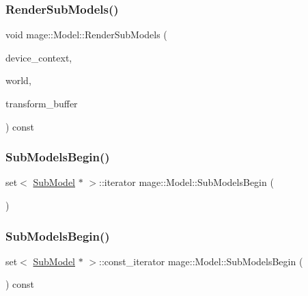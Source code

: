 \hypertarget{classmage_1_1_model_aa7f89b4f08adde59e27f3eb06428c17f}{}\label{classmage_1_1_model_aa7f89b4f08adde59e27f3eb06428c17f} 
\subsubsection{\texorpdfstring{Render\+Sub\+Models()}{RenderSubModels()}}
{\footnotesize\ttfamily void mage\+::\+Model\+::\+Render\+Sub\+Models (\begin{DoxyParamCaption}\item[{\hyperlink{namespacemage_ae74f374780900893caa5555d1031fd79}{Com\+Ptr}$<$ I\+D3\+D11\+Device\+Context2 $>$}]{device\+\_\+context,  }\item[{const \hyperlink{classmage_1_1_world}{World} \&}]{world,  }\item[{const \hyperlink{structmage_1_1_transform_buffer}{Transform\+Buffer} \&}]{transform\+\_\+buffer }\end{DoxyParamCaption}) const\hspace{0.3cm}{\ttfamily [private]}}

\hypertarget{classmage_1_1_model_a8845f0db130f224f41132996a206c354}{}\label{classmage_1_1_model_a8845f0db130f224f41132996a206c354} 
\subsubsection{\texorpdfstring{Sub\+Models\+Begin()}{SubModelsBegin()}\hspace{0.1cm}{\footnotesize\ttfamily [1/2]}}
{\footnotesize\ttfamily set$<$ \hyperlink{classmage_1_1_sub_model}{Sub\+Model} $\ast$ $>$\+::iterator mage\+::\+Model\+::\+Sub\+Models\+Begin (\begin{DoxyParamCaption}{ }\end{DoxyParamCaption})}

\hypertarget{classmage_1_1_model_a043f7ac7bbaa1bd60bec3bc517428775}{}\label{classmage_1_1_model_a043f7ac7bbaa1bd60bec3bc517428775} 
\subsubsection{\texorpdfstring{Sub\+Models\+Begin()}{SubModelsBegin()}\hspace{0.1cm}{\footnotesize\ttfamily [2/2]}}
{\footnotesize\ttfamily set$<$ \hyperlink{classmage_1_1_sub_model}{Sub\+Model} $\ast$ $>$\+::const\+\_\+iterator mage\+::\+Model\+::\+Sub\+Models\+Begin (\begin{DoxyParamCaption}{ }\end{DoxyParamCaption}) const}

